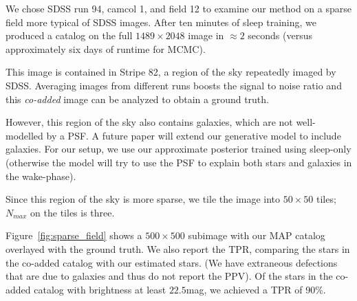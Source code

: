 We chose SDSS run 94, camcol 1, and field  12 to examine our method on a sparse field more typical of SDSS 
images. After ten minutes of sleep training, we produced a catalog on the full $1489\times 2048$ image in $\approx2$ seconds (versus approximately six days of runtime for MCMC). 

This image is contained in Stripe 82, a region of the sky repeatedly imaged by SDSS. Averaging images from different runs boosts the signal to noise ratio and this {\itshape co-added} image can be analyzed to obtain a ground truth. 

However, this region of the sky also contains galaxies, which are 
not well-modelled by a PSF. A future paper will extend our generative model to include galaxies. For our setup, we use our approximate posterior 
trained using sleep-only (otherwise the model will try to use the PSF to explain both stars and galaxies in the wake-phase). 

Since this region of the sky is more sparse, we tile the image into $50\times 50$ tiles; $N_{max}$ on the tiles is three. 

Figure~\ref{fig:sparse_field} shows a $500\times 500$ subimage with 
our MAP catalog overlayed with the ground truth. We also report the 
TPR, comparing the stars in the co-added catalog with our estimated stars. (We have extraneous defections that are due to galaxies and thus 
do not report the PPV). Of the stars in the co-added catalog with brightness at least $22.5$mag, we achieved a TPR of 90\%. 


